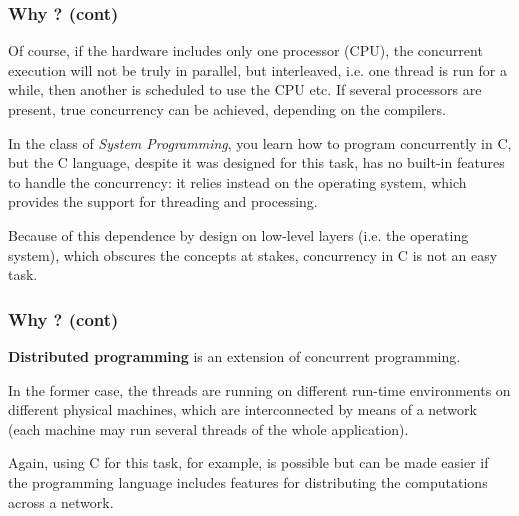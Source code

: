 %
\begin{frame}
\frametitle{Why \Erlang? (cont)}

Of course, if the hardware includes only one processor (CPU), the
concurrent execution will not be truly in parallel, but interleaved,
i.e. one thread is run for a while, then another is scheduled to use
the CPU etc. If several processors are present, true concurrency can
be achieved, depending on the compilers.

\bigskip

In the class of \emph{System Programming}, you learn how to program
concurrently in C, but the C language, despite it was designed for
this task, has no built-in features to handle the concurrency: it
relies instead on the operating system, which provides the support for
threading and processing.

\bigskip

Because of this dependence by design on low-level layers (i.e. the
operating system), which obscures the concepts at stakes, concurrency
in C is not an easy task.

\end{frame}

%
\begin{frame}
\frametitle{Why \Erlang? (cont)}

\textbf{Distributed programming} is an extension of concurrent
programming. 

\bigskip

In the former case, the threads are running on different run-time
environments on different physical machines, which are interconnected
by means of a network (each machine may run several threads of the
whole application).

\bigskip

Again, using C for this task, for example, is possible but can be made
easier if the programming language includes features for distributing
the computations across a network.

\end{frame}


